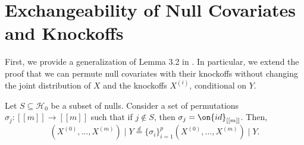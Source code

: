 \documentclass[11pt,reqno]{report}
\theoremstyle{definition}
\numberwithin{equation}{section}
\begin{document}
\section{Exchangeability of Null Covariates and Knockoffs}
First, we provide a generalization of Lemma 3.2 in \cite{panning}. In particular, we extend the proof that we can permute null covariates with their knockoffs without changing the joint distribution of $X$ and the knockoffs $X^{(i)}$, conditional on $Y$.
\begin{lem}
\label{lemma2.3}
Let $S \subseteq \mathcal{H}_0$ be a subset of nulls. Consider a set of permutations $\sigma_j : [[ m ]] \to [[ m ]]$ such that if $j \not \in S$, then $\sigma_j = \on{id}_{[[ m ]]}$. Then,
\[(X^{(0)}, \ldots, X^{(m)}) \mid Y \overset{d}= \{ \sigma_i \}_{i=1}^p \left( X^{(0)}, \ldots, X^{(m)} \right) \mid Y. \]
\end{lem}
\end{document}
